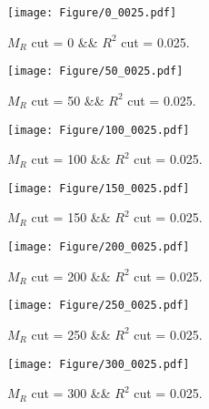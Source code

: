  
\begin{figure}[H] 
\begin{center} 
\texttt{[image: Figure/0\_0025.pdf]} 
\caption{$M_R$ cut = 0 \&\& $R^2$ cut = 0.025.} 
\label{Fig:0_0.025} 
\end{center} 
\end{figure} 
 
 
\begin{figure}[H] 
\begin{center} 
\texttt{[image: Figure/50\_0025.pdf]} 
\caption{$M_R$ cut = 50 \&\& $R^2$ cut = 0.025.} 
\label{Fig:50_0.025} 
\end{center} 
\end{figure} 
 
 
\begin{figure}[H] 
\begin{center} 
\texttt{[image: Figure/100\_0025.pdf]} 
\caption{$M_R$ cut = 100 \&\& $R^2$ cut = 0.025.} 
\label{Fig:100_0.025} 
\end{center} 
\end{figure} 
 
 
\begin{figure}[H] 
\begin{center} 
\texttt{[image: Figure/150\_0025.pdf]} 
\caption{$M_R$ cut = 150 \&\& $R^2$ cut = 0.025.} 
\label{Fig:150_0.025} 
\end{center} 
\end{figure} 
 
 
\begin{figure}[H] 
\begin{center} 
\texttt{[image: Figure/200\_0025.pdf]} 
\caption{$M_R$ cut = 200 \&\& $R^2$ cut = 0.025.} 
\label{Fig:200_0.025} 
\end{center} 
\end{figure} 
 
 
\begin{figure}[H] 
\begin{center} 
\texttt{[image: Figure/250\_0025.pdf]} 
\caption{$M_R$ cut = 250 \&\& $R^2$ cut = 0.025.} 
\label{Fig:250_0.025} 
\end{center} 
\end{figure} 
 
 
\begin{figure}[H] 
\begin{center} 
\texttt{[image: Figure/300\_0025.pdf]} 
\caption{$M_R$ cut = 300 \&\& $R^2$ cut = 0.025.} 
\label{Fig:300_0.025} 
\end{center} 
\end{figure} 
 
